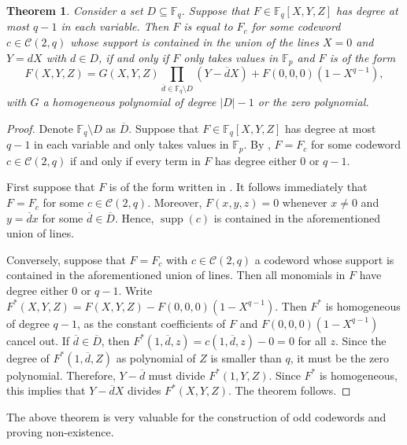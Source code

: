 \documentclass[12pt, a4paper]{article}
\newtheorem{thm}{Theorem}[section]
\theoremstyle{definition}
\newcommand{\FF}{\mathbb F}
\newcommand{\mc}{\mathcal C}
\DeclareMathOperator{\supp}{supp}
\begin{document}
\begin{thm} 
 \label{Thm:ConcurrentCodeword}
 Consider a set $D \subseteq \FF_q$.
 Suppose that $F \in \FF_q[X,Y,Z]$ has degree at most $q-1$ in each variable.
 Then $F$ is equal to $F_c$ for some codeword $c \in \mc(2,q)$ whose support is contained in the union of the lines $X=0$ and $Y = d X$ with $d \in D$, if and only if $F$ only takes values in $\FF_p$ and $F$ is of the form
 \begin{equation}
  \label{Eq:DGM}
  F(X,Y,Z) = G(X,Y,Z) \prod_{\overline d \in \FF_q \setminus D} (Y - \overline d X) + F(0,0,0) (1 - X^{q-1}),
 \end{equation}
 with $G$ a homogeneous polynomial of degree $|D| - 1$ or the zero polynomial.
\end{thm}

\begin{proof}
 Denote $\FF_q \setminus D$ as $\overline D$.
 Suppose that $F \in \FF_q[X,Y,Z]$ has degree at most $q-1$ in each variable and only takes values in $\FF_p$.
 By , $F = F_c$ for some codeword $c \in \mc(2,q)$ if and only if every term in $F$ has degree either $0$ or $q-1$.
 
 First suppose that $F$ is of the form written in .
 It follows immediately that $F = F_c$  for some $c \in \mc(2,q)$.
 Moreover, $F(x,y,z) = 0$ whenever $x \neq 0$ and $y = \overline d x$ for some $\overline d \in \overline D$.
 Hence, $\supp(c)$ is contained in the aforementioned union of lines.

 Conversely, suppose that $F = F_c$ with $c \in \mc(2,q)$ a codeword whose support is contained in the aforementioned union of lines.
 Then all monomials in $F$ have degree either 0 or $q-1$.
 Write $F^*(X,Y,Z) = F(X,Y,Z) - F(0,0,0)(1 - X^{q-1})$.
 Then $F^*$ is homogeneous of degree $q-1$, as the constant coefficients of $F$ and $F(0,0,0)(1-X^{q-1})$ cancel out.
 If $\overline d \in \overline D$, then $F^*(1,\overline d,z) = c(1,\overline d,z) - 0 = 0$ for all $z$.
 Since the degree of $F^*(1,\overline d,Z)$ as polynomial of $Z$ is smaller than $q$, it must be the zero polynomial.
 Therefore, $Y-\overline d$ must divide $F^*(1,Y,Z)$.
 Since $F^*$ is homogeneous, this implies that $Y-\overline d X$ divides $F^*(X,Y,Z)$.
 The theorem follows.
\end{proof}

The above theorem is very valuable for the construction of odd codewords and proving non-existence.
\end{document}
